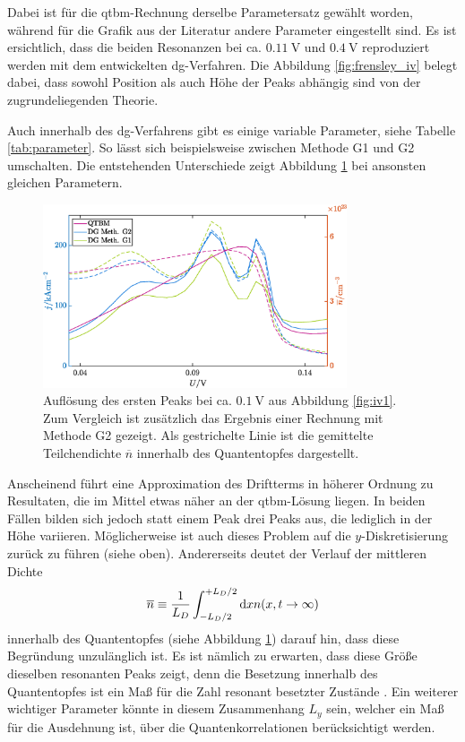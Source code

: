 Dabei ist für die \ac{qtbm}-Rechnung derselbe Parametersatz gewählt worden, während für die Grafik aus der Literatur \cite{frensley3} andere Parameter eingestellt sind. Es ist ersichtlich, dass die beiden Resonanzen bei ca. $\SI{0.11}{\volt}$ und $\SI{0.4}{\volt}$ reproduziert werden mit dem entwickelten \ac{dg}-Verfahren. Die Abbildung \ref{fig:frensley_iv} belegt dabei, dass sowohl Position als auch Höhe der Peaks abhängig sind von der zugrundeliegenden Theorie.

Auch innerhalb des \ac{dg}-Verfahrens gibt es einige variable Parameter, siehe Tabelle \ref{tab:parameter}. So lässt sich beispielsweise zwischen Methode G1 und G2 umschalten. Die entstehenden Unterschiede zeigt Abbildung \ref{fig:iv2} bei ansonsten gleichen Parametern.
\begin{figure}
  \centering
  \includegraphics[width=0.8\textwidth]{plots/IV/IV_qtbm_dg_fein.eps}
  \caption{Auflösung des ersten Peaks bei ca. $\SI{0.1}{\volt}$ aus Abbildung \ref{fig:iv1}. Zum Vergleich ist zusätzlich das Ergebnis einer Rechnung mit Methode G2 gezeigt. Als gestrichelte Linie ist die gemittelte Teilchendichte $\overline{n}$ innerhalb des Quantentopfes dargestellt.}
  \label{fig:iv2}
\end{figure}
Anscheinend führt eine Approximation des Driftterms in höherer Ordnung zu Resultaten, die im Mittel etwas näher an der \ac{qtbm}-Lösung liegen. In beiden Fällen bilden sich jedoch statt einem Peak drei Peaks aus, die lediglich in der Höhe variieren. Möglicherweise ist auch dieses Problem auf die $y$-Diskretisierung zurück zu führen (siehe oben). Andererseits deutet der Verlauf der mittleren Dichte
\begin{equation*}
  \overline{n} \equiv \frac{1}{L_D} \int_{-L_D/2}^{+L_D/2} \mathop{}\!\mathrm{d} x n(x,t\rightarrow\infty)
\end{equation*}
innerhalb des Quantentopfes (siehe Abbildung \ref{fig:iv2}) darauf hin, dass diese Begründung unzulänglich ist. Es ist nämlich zu erwarten, dass diese Größe dieselben resonanten Peaks zeigt, denn die Besetzung innerhalb des Quantentopfes ist ein Maß für die Zahl resonant besetzter Zustände \cite{frensley3}. Ein weiterer wichtiger Parameter könnte in diesem Zusammenhang $L_y$ sein, welcher ein Maß für die Ausdehnung ist, über die Quantenkorrelationen berücksichtigt werden.


